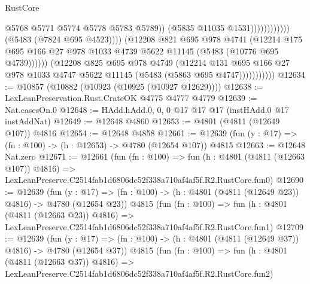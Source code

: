 \begin{lexlean}{RustCore}
\begin{coremodule}
                                                    @5768
                                                    @5771
                                                    @5774
                                                    @5778
                                                    @5783
                                                    @5789))
                                                (@5835 @11035 @1531))))))))))))
                          (@5483 (@7824 @695 @4523))))
                      (@12208
                        @821
                        @695
                        @978
                        @4741
                        (@12214
                          @175
                          @695
                          @166
                          @27
                          @978
                          @1033
                          @4739
                          @5622
                          @11145
                          (@5483 (@10776 @695 @4739))))))
                  (@12208
                    @825
                    @695
                    @978
                    @4749
                    (@12214
                      @131
                      @695
                      @166
                      @27
                      @978
                      @1033
                      @4747
                      @5622
                      @11145
                      (@5483 (@5863 @695 @4747)))))))))))
@12634 := @10857 (@10882 (@10923 (@10925 (@10927 @12629))))
@12638 := LexLeanPreservation.Rust.CrateOK @4775 @4777 @4779
@12639 := Nat.casesOn.{0}
@12648 := HAdd.hAdd.{0, 0, 0} @17 @17 @17 (instHAdd.{0} @17 instAddNat)
@12649 := @12648 @4860
@12653 := @4801 (@4811 (@12649 @107)) @4816
@12654 := @12648 @4858
@12661 := @12639 (fun (y : @17) => (fn : @100) -> (h : @12653) -> @4780 (@12654 @107)) @4815
@12663 := @12648 Nat.zero
@12671 := @12661
    (fun (fn : @100) =>
    fun (h : @4801 (@4811 (@12663 @107)) @4816) =>
    LexLeanPreserve.C2514fab1d6806dc52f338a710af4af5f.R2.RustCore.fun0)
@12690 := @12639
    (fun (y : @17) => (fn : @100) -> (h : @4801 (@4811 (@12649 @23)) @4816) -> @4780 (@12654 @23))
    @4815
    (fun (fn : @100) =>
    fun (h : @4801 (@4811 (@12663 @23)) @4816) =>
    LexLeanPreserve.C2514fab1d6806dc52f338a710af4af5f.R2.RustCore.fun1)
@12709 := @12639
    (fun (y : @17) => (fn : @100) -> (h : @4801 (@4811 (@12649 @37)) @4816) -> @4780 (@12654 @37))
    @4815
    (fun (fn : @100) =>
    fun (h : @4801 (@4811 (@12663 @37)) @4816) =>
    LexLeanPreserve.C2514fab1d6806dc52f338a710af4af5f.R2.RustCore.fun2)

\end{coremodule}
\end{lexlean}
